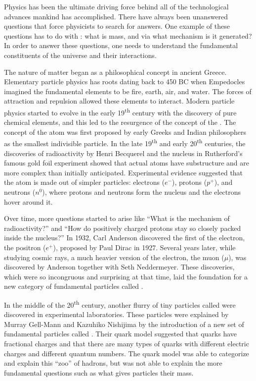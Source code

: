 \vspace{0.015\textheight}
Physics has been the ultimate driving force behind all of the technological advances mankind has accomplished. There have always been unanswered questions that force physicists to search for answers. One example of these questions has to do with : what is mass, and via what mechanism is it generated? In order to answer these questions, one needs to understand the fundamental constituents of the universe and their interactions.

The nature of matter began as a philosophical concept in ancient Greece. Elementary particle physics has roots dating back to 450 BC when Empedocles imagined the fundamental elements to be fire, earth, air, and water. The forces of attraction and repulsion allowed these elements to interact. Modern particle physics started to evolve in the early 19\textsuperscript{th} century with the discovery of pure chemical elements, and this led to the resurgence of the concept of the . The concept of the atom was first proposed by early Greeks and Indian philosophers as the smallest indivisible particle. In the late 19\textsuperscript{th} and early 20\textsuperscript{th} centuries, the discoveries of radioactivity by Henri Becquerel and the nucleus in Rutherford's famous gold foil experiment showed that actual atoms have substructure and are more complex than initially anticipated. Experimental evidence suggested that the atom is made out of simpler particles: electrons ($e^{-}$), protons ($p^{+}$), and neutrons ($n^{0}$), where protons and neutrons form the nucleus and the electrons hover around it.

Over time, more questions started to arise like ``What is the mechanism of radioactivity?''  and ``How do positively charged protons stay so closely packed inside the nucleus?''  In 1932, Carl Anderson discovered the first  of the electron, the positron ($e^{+}$), proposed by Paul Dirac in 1927. Several years later, while studying cosmic rays, a much heavier version of the electron, the muon ($\mu$), was discovered by Anderson together with Seth Neddermeyer. These discoveries, which were so incongruous and surprising at that time, laid the foundation for a new category of fundamental particles called .

In the middle of the 20\textsuperscript{th} century, another flurry of tiny particles called  were discovered in experimental laboratories. These particles were explained by Murray Gell-Mann and Kazuhiko Nishijima by the introduction of a new set of fundamental particles called . Their quark model suggested that quarks have fractional charges and that there are many types of quarks with different electric charges and different quantum numbers. The quark model was able to categorize and explain this ``zoo'' of hadrons, but was not able to explain the more fundamental questions such as what gives particles their mass.

